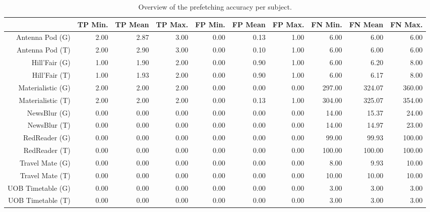 \begin{table}[ht]
\centering
\begin{tabular}{rrrrrrrrrr}
  \hline
 & TP Min. & TP Mean & TP Max. & FP Min. & FP Mean & FP Max. & FN Min. & FN Mean & FN Max. \\ 
  \hline
Antenna Pod (G) & 2.00 & 2.87 & 3.00 & 0.00 & 0.13 & 1.00 & 6.00 & 6.00 & 6.00 \\ 
  Antenna Pod (T) & 2.00 & 2.90 & 3.00 & 0.00 & 0.10 & 1.00 & 6.00 & 6.00 & 6.00 \\ 
  Hill'Fair (G) & 1.00 & 1.90 & 2.00 & 0.00 & 0.90 & 1.00 & 6.00 & 6.20 & 8.00 \\ 
  Hill'Fair (T) & 1.00 & 1.93 & 2.00 & 0.00 & 0.90 & 1.00 & 6.00 & 6.17 & 8.00 \\ 
  Materialistic (G) & 2.00 & 2.00 & 2.00 & 0.00 & 0.00 & 0.00 & 297.00 & 324.07 & 360.00 \\ 
  Materialistic (T) & 2.00 & 2.00 & 2.00 & 0.00 & 0.13 & 1.00 & 304.00 & 325.07 & 354.00 \\ 
  NewsBlur (G) & 0.00 & 0.00 & 0.00 & 0.00 & 0.00 & 0.00 & 14.00 & 15.37 & 24.00 \\ 
  NewsBlur (T) & 0.00 & 0.00 & 0.00 & 0.00 & 0.00 & 0.00 & 14.00 & 14.97 & 23.00 \\ 
  RedReader (G) & 0.00 & 0.00 & 0.00 & 0.00 & 0.00 & 0.00 & 99.00 & 99.93 & 100.00 \\ 
  RedReader (T) & 0.00 & 0.00 & 0.00 & 0.00 & 0.00 & 0.00 & 100.00 & 100.00 & 100.00 \\ 
  Travel Mate (G) & 0.00 & 0.00 & 0.00 & 0.00 & 0.00 & 0.00 & 8.00 & 9.93 & 10.00 \\ 
  Travel Mate (T) & 0.00 & 0.00 & 0.00 & 0.00 & 0.00 & 0.00 & 10.00 & 10.00 & 10.00 \\ 
  UOB Timetable (G) & 0.00 & 0.00 & 0.00 & 0.00 & 0.00 & 0.00 & 3.00 & 3.00 & 3.00 \\ 
  UOB Timetable (T) & 0.00 & 0.00 & 0.00 & 0.00 & 0.00 & 0.00 & 3.00 & 3.00 & 3.00 \\ 
   \hline
\end{tabular}
\caption{Overview of the prefetching accuracy per subject.} 
\label{tab:results:rq3:summary:subject:count}
\end{table}
